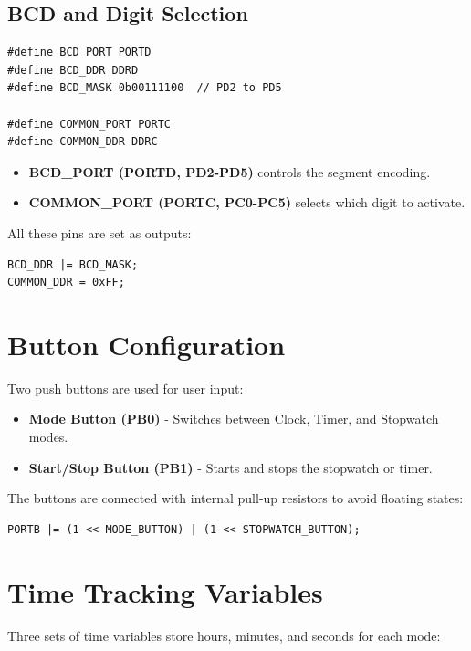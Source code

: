 \documentclass[a4paper,12pt]{article}
\begin{document}
\subsection*{BCD and Digit Selection}

\begin{lstlisting}
#define BCD_PORT PORTD
#define BCD_DDR DDRD
#define BCD_MASK 0b00111100  // PD2 to PD5

#define COMMON_PORT PORTC
#define COMMON_DDR DDRC
\end{lstlisting}

\begin{itemize}
    \item \textbf{BCD\_PORT (PORTD, PD2-PD5)} controls the segment encoding.
    \item \textbf{COMMON\_PORT (PORTC, PC0-PC5)} selects which digit to activate.
\end{itemize}

All these pins are set as outputs:

\begin{lstlisting}
BCD_DDR |= BCD_MASK;
COMMON_DDR = 0xFF;
\end{lstlisting}

\section*{Button Configuration}

Two push buttons are used for user input:

\begin{itemize}
    \item \textbf{Mode Button (PB0)} - Switches between Clock, Timer, and Stopwatch modes.
    \item \textbf{Start/Stop Button (PB1)} - Starts and stops the stopwatch or timer.
\end{itemize}

The buttons are connected with internal pull-up resistors to avoid floating states:

\begin{lstlisting}
PORTB |= (1 << MODE_BUTTON) | (1 << STOPWATCH_BUTTON);
\end{lstlisting}

\section*{Time Tracking Variables}
Three sets of time variables store hours, minutes, and seconds for each mode:
\end{document}

